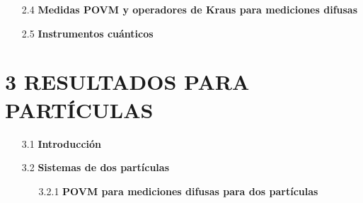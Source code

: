 \documentclass[12pt,oneside]{book}\raggedbottom{} %
\begin{document}
\begin{sloppypar}
{{\begin{itemize}
\begin{itemize}
\end{itemize}




  \item[2.4]\textbf{Medidas POVM y operadores de Kraus para mediciones difusas}

  
  
  \item[2.5]  \textbf{Instrumentos cuánticos} 
\end{itemize}


\section*{3 RESULTADOS PARA \texorpdfstring{}{N}  PARTÍCULAS}
\begin{itemize}

  \item[3.1] \textbf{Introducción}   
  
  \item[3.2]  \textbf{Sistemas de dos partículas}

  \begin{itemize}
    \item[3.2.1] \textbf{POVM para mediciones difusas para dos partículas}\label{Sec_POVM_para_mediciones_difusas} 
    

\end{itemize}
\end{itemize}}}
\end{sloppypar}
\end{document}
